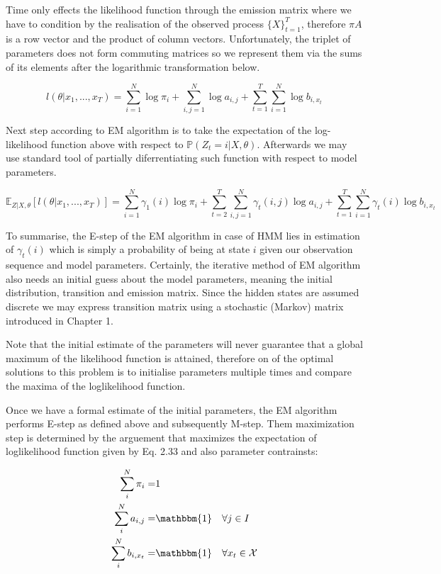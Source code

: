 Time only effects the likelihood function through the emission matrix where we have to condition by the realisation of the observed process $\{X\}_{t=1}^T$, therefore $\pi A$ is a row vector and the product of column vectors. Unfortunately, the triplet of parameters does not form commuting matrices so we represent them via the sums of its elements after the logarithmic transformation below.

\begin{equation}
l(\theta|x_1,...,x_T) = \sum_{i=1}^{N}  \log \pi_i + \sum_{i,j=1}^{N} \log a_{i,j}+ \sum_{t=1}^{T} \sum_{i=1}^{N} \log b_{i,x_t}
\end{equation}

Next step according to EM algorithm is to take the expectation of the log-likelihood function above with respect to $\mathbb{P}(Z_t=i|X,\theta)$. Afterwards we may use standard tool of partially diferrentiating such function with respect to model parameters.

\begin{equation}
\mathbb{E}_{Z|X,\theta} [l(\theta|x_1,...,x_T)] = \sum_{i=1}^{N} \gamma_1(i) \log \pi_i + \sum_{t=2}^{T} \sum_{i,j=1}^{N} \gamma_t (i,j) \log a_{i,j}+ \sum_{t=1}^{T} \sum_{i=1}^{N} \gamma_t (i) \log b_{i,x_t}
\end{equation}

To summarise, the E-step of the EM algorithm in case of HMM lies in estimation of $\gamma_t(i)$ which is simply a probability of being at state $i$ given our observation sequence and model parameters. Certainly, the iterative method of EM algorithm also needs an initial guess about the model parameters, meaning the initial distribution, transition and emission matrix. Since the hidden states are assumed discrete we may express transition matrix using a stochastic (Markov) matrix introduced in Chapter 1.

Note that the initial estimate of the parameters will never guarantee that a global maximum of the likelihood function is attained, therefore on of the optimal solutions to this problem is to initialise parameters multiple times and compare the maxima of the loglikelihood function. 

Once we have a formal estimate of the initial parameters, the EM algorithm performs E-step as defined above and subsequently M-step. Them maximization step is determined by the arguement that maximizes the expectation of loglikelihood function given by Eq. 2.33 and also parameter contrainsts:

\begin{align}
\displaystyle \sum_i^N \pi_i =& 1 \\
\displaystyle \sum_i^N a_{i,j} =& \mathbbm{1} \quad  \forall j \in I \\
\displaystyle \sum_i^N b_{i,x_t} =& \mathbbm{1} \quad \forall x_t \in \mathcal{X}
\end{align} 

